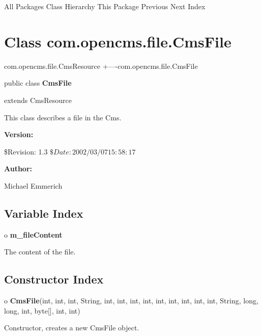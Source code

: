 \begin{PRE}
All Packages  Class Hierarchy  This Package  Previous  Next  Index
\end{PRE}

\htmlHR

\section*{  Class com.opencms.file.CmsFile }

\begin{PRE}
com.opencms.file.CmsResource
   {\htmlBar}
   +----com.opencms.file.CmsFile
\end{PRE}

\htmlHR

\begin{description}
\item public class {\bf CmsFile}  
\item extends CmsResource 
\end{description}

This class describes a file in the Cms. 

\begin{description}
\item {\bf Version:}  

\$Revision: 1.3 $ \$Date: 2002/03/07 15:58:17 $  
\item {\bf Author:}  

Michael Emmerich 
\end{description}

\htmlHR

\subsection*{  Variable Index }

\begin{description}
\item o {\bf m\_fileContent}  

The content of the file. 
\end{description}

\subsection*{  Constructor Index }

\begin{description}
\item o {\bf CmsFile}(int, int, int, String, int, int, int, int, int, int,
int, int, int, String, long, long, int, byte[], int, int)  

Constructor, creates a new CmsFile object. 
\end{description}

